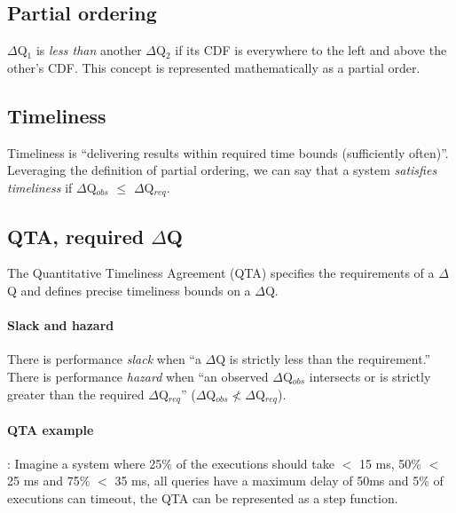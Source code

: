     \subsection{Partial ordering}
        $\Delta$Q$_1$ is \textit{less than} another $\Delta$Q$_2$ if its CDF is everywhere to the left and above the other's CDF. This concept is represented mathematically as a partial order. \cite{dq-tut} 

    \subsection{Timeliness}
        Timeliness is ``delivering results within required time bounds (sufficiently often)''. \cite{dq-tut}
        Leveraging the definition of partial ordering, we can say that a system \textit{satisfies timeliness} if $\Delta$Q$_{obs}$ $\le$ $\Delta$Q$_{req}$. \cite{art}
     
    \subsection{QTA, required $\Delta$Q}
        The Quantitative Timeliness Agreement (QTA) specifies the requirements of a $\Delta$Q and defines precise timeliness bounds on a $\Delta$Q. \cite{dq-br} \cite{art}
    
    \paragraph{Slack and hazard} There is performance \textit{slack} when ``a $\Delta$Q is strictly less than the requirement.'' \\
    There is performance \textit{hazard} when ``an observed $\Delta$Q$_{obs}$ intersects or is strictly greater than the required $\Delta$Q$_{req}$'' ($\Delta$Q$_{obs} \nless \Delta$Q$_{req}$). \cite{myo}
 
    \paragraph{QTA example}: Imagine a system where 25\% of the executions should take $<$ 15 ms, 50\% $<$ 25 ms and 75\% $<$ 35 ms, all queries have a maximum delay of 50ms and 5\% of executions can timeout, the QTA can be represented as a step function.
    
